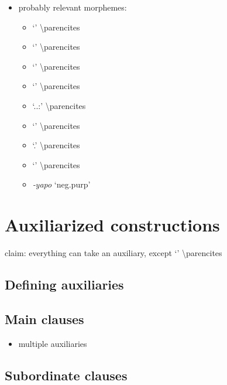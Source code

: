 \documentclass{memoir}
\begin{document}
\begin{itemize}
\tightlist
\item
  probably relevant morphemes:

  \begin{itemize}
  \tightlist
  \item
     `' \textbackslash parencites
  \item
     `' \textbackslash parencites
  \item
     `' \textbackslash parencites
  \item
     `' \textbackslash parencites
  \item
     `..:'
    \textbackslash parencites
  \item
     `' \textbackslash parencites
  \item
     `.' \textbackslash parencites
  \item
     `' \textbackslash parencites
  \item
    \emph{‑yapo} `neg.purp'
  \end{itemize}
\end{itemize}

\chapter{Auxiliarized constructions}

claim: everything can take an auxiliary, except  `'
\textbackslash parencites

\section{Defining auxiliaries}

\section{Main clauses}

\begin{itemize}
\tightlist
\item
  multiple auxiliaries
\end{itemize}

\section{Subordinate clauses}
\end{document}

